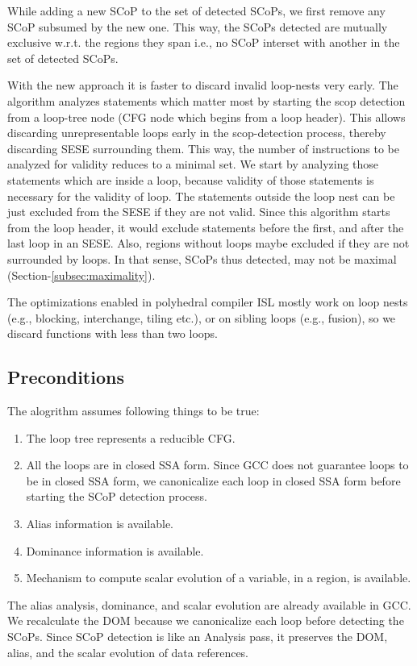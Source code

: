 \documentclass{sigplanconf}
\begin{document}
While adding a new SCoP to the set of detected SCoPs, we first remove any SCoP
subsumed by the new one. This way, the SCoPs detected are mutually exclusive
w.r.t. the regions they span i.e., no SCoP interset with another in the set of
detected SCoPs.

With the new approach it is faster to discard invalid loop-nests very early. The
algorithm analyzes statements which matter most by starting the scop detection
from a loop-tree node (CFG node which begins from a loop header). This allows
discarding unrepresentable loops early in the scop-detection process, thereby
discarding SESE surrounding them.  This way, the number of instructions to be
analyzed for validity reduces to a minimal set.  We start by analyzing those
statements which are inside a loop, because validity of those statements is
necessary for the validity of loop. The statements outside the loop nest can be
just excluded from the SESE if they are not valid. Since this algorithm starts
from the loop header, it would exclude statements before the first, and after
the last loop in an SESE. Also, regions without loops maybe excluded if they are
not surrounded by loops. In that sense, SCoPs thus detected, may not be maximal
(Section-\ref{subsec:maximality}).

The optimizations enabled in polyhedral compiler ISL mostly work on loop
nests (e.g., blocking, interchange, tiling etc.), or on sibling loops (e.g.,
fusion), so we discard functions with less than two loops.

\subsection{Preconditions}
The alogrithm assumes following things to be true:
\begin{enumerate}
\item The loop tree represents a reducible CFG.
\item All the loops are in closed SSA form. Since GCC does not guarantee
loops to be in closed SSA form, we canonicalize each loop in closed SSA form
before starting the SCoP detection process.
\item Alias information is available.
\item Dominance information is available.
\item Mechanism to compute scalar evolution of a variable, in a region, is
  available.
\end{enumerate}

The alias analysis, dominance, and scalar evolution are already available in
GCC.  We recalculate the DOM because we canonicalize each loop before detecting
the SCoPs.  Since SCoP detection is like an Analysis pass, it preserves the DOM,
alias, and the scalar evolution of data references.
\end{document}
